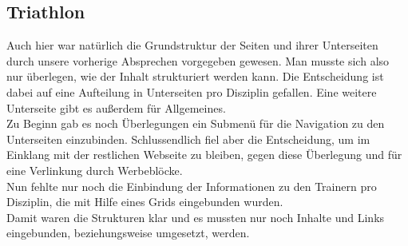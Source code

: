 \documentclass[12pt,a4paper]{article}
\begin{document}
\subsection{Triathlon}
Auch hier war natürlich die Grundstruktur der Seiten und ihrer Unterseiten durch unsere vorherige Absprechen vorgegeben gewesen. Man musste sich also nur überlegen, wie der Inhalt strukturiert werden kann. Die Entscheidung ist dabei auf eine Aufteilung in Unterseiten pro Disziplin gefallen. Eine weitere Unterseite gibt es außerdem für Allgemeines. \\
Zu Beginn gab es noch Überlegungen ein Submenü für die Navigation zu den Unterseiten einzubinden. Schlussendlich fiel aber die Entscheidung, um im Einklang mit der restlichen Webseite zu bleiben, gegen diese Überlegung und für eine Verlinkung durch Werbeblöcke. \\
Nun fehlte nur noch die Einbindung der Informationen zu den Trainern pro Disziplin, die mit Hilfe eines Grids eingebunden wurden. \\
Damit waren die Strukturen klar und es mussten nur noch Inhalte und Links eingebunden, beziehungsweise umgesetzt, werden. 
\newpage
\end{document}
